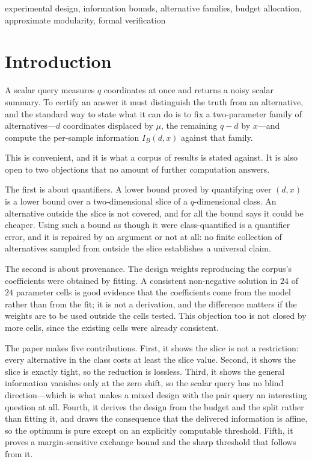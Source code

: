 \begin{IEEEkeywords}
experimental design, information bounds, alternative families, budget allocation,
approximate modularity, formal verification
\end{IEEEkeywords}

\section{Introduction}

A scalar query measures $q$ coordinates at once and returns a noisy scalar summary. To
certify an answer it must distinguish the truth from an alternative, and the standard way to
state what it can do is to fix a two-parameter family of alternatives---$d$ coordinates
displaced by $\mu$, the remaining $q-d$ by $x$---and compute the per-sample information
$I_{B}(d,x)$ against that family.

This is convenient, and it is what a corpus of results is stated against. It is also open to
two objections that no amount of further computation answers.

The first is about quantifiers. A lower bound proved by quantifying over $(d,x)$ is a lower
bound over a two-dimensional slice of a $q$-dimensional class. An alternative outside the
slice is not covered, and for all the bound says it could be cheaper. Using such a bound as
though it were class-quantified is a quantifier error, and it is repaired by an argument or
not at all: no finite collection of alternatives sampled from outside the slice establishes a
universal claim.

The second is about provenance. The design weights reproducing the corpus's coefficients were
obtained by fitting. A consistent non-negative solution in $24$ of $24$ parameter cells is
good evidence that the coefficients come from the model rather than from the fit; it is not a
derivation, and the difference matters if the weights are to be used outside the cells
tested. This objection too is not closed by more cells, since the existing cells were already
consistent.

The paper makes five contributions. First, it shows the slice is not a restriction: every
alternative in the class costs at least the slice value. Second, it shows the slice is exactly
tight, so the reduction is lossless. Third, it shows the general information vanishes only at
the zero shift, so the scalar query has no blind direction---which is what makes a mixed
design with the pair query an interesting question at all. Fourth, it derives the design from
the budget and the split rather than fitting it, and draws the consequence that the delivered
information is affine, so the optimum is pure except on an explicitly computable threshold.
Fifth, it proves a margin-sensitive exchange bound and the sharp threshold that follows from
it.


